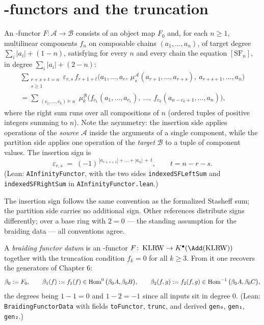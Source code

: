 \section{\texorpdfstring{\Ainf}{A-infinity}-functors and the truncation}

\begin{definition}\label{def:ainf-functor}
  An \Ainf-functor $F \colon \mathcal{A} \to \mathcal{B}$ consists of an
  object map $F_0$ and, for each $n \geq 1$, multilinear components $f_n$ on
  composable chains $(a_1, \dots, a_n)$, of target degree
  $\sum_i |a_i| + (1 - n)$, satisfying for every $n$ and every chain the
  equation $[\mathrm{SF}_n]$, in degree $\sum_i |a_i| + (2-n)$:
  \begin{multline*}
    \sum_{\substack{r + s + t = n\\ s \geq 1}}
      \varepsilon_{r,s}\,
      f_{r+1+t}\big(a_1, \dots, a_r,\ \mu^{\mathcal A}_s(a_{r+1}, \dots, a_{r+s}),\
        a_{r+s+1}, \dots, a_n\big) \\
    = \sum_{\substack{(c_1, \dots, c_k) \vDash n}}
      \mu^{\mathcal B}_k\big(f_{c_1}(a_1, \dots, a_{c_1}),\ \dots,\
        f_{c_k}(a_{n-c_k+1}, \dots, a_n)\big),
  \end{multline*}
  where the right sum runs over all compositions of $n$ (ordered tuples of
  positive integers summing to $n$). Note the asymmetry: the insertion side
  applies operations of the \emph{source} $\mathcal{A}$ inside the arguments
  of a single component, while the partition side applies one operation of
  the \emph{target} $\mathcal{B}$ to a tuple of component values. The
  insertion sign is
  \[
    \varepsilon_{r,s} \;=\; (-1)^{\,|a_{r+s+1}| + \dots + |a_n| \, +\, t},
    \qquad t = n - r - s .
  \]
  (Lean: \texttt{AInfinityFunctor}, with the two sides
  \texttt{indexedSFLeftSum} and \texttt{indexedSFRightSum} in
  \texttt{AInfinityFunctor.lean}.)
\end{definition}

\begin{remark}
  The insertion sign follows the same convention as the formalized Stasheff
  sum; the partition side carries no additional sign. Other references
  distribute signs differently; over a base ring with $2 = 0$ --- the standing
  assumption for the braiding data --- all conventions agree.
\end{remark}

\begin{definition}[braiding functor data]\label{def:bfd}
  A \emph{braiding functor datum} is an \Ainf-functor
  $F \colon \KLRW \to K^\bullet(\Add(\KLRW))$ together with the truncation
  condition $f_k = 0$ for all $k \geq 3$. From it one recovers the generators
  of Chapter 6:
  \[
    \beta_0 := F_0, \qquad
    \beta_1(f) := f_1(f) \in \operatorname{Hom}^{0}\big(\beta_0 A, \beta_0 B\big), \qquad
    \beta_2(f,g) := f_2(f,g) \in \operatorname{Hom}^{-1}\big(\beta_0 A, \beta_0 C\big),
  \]
  the degrees being $1 - 1 = 0$ and $1 - 2 = -1$ since all inputs sit in
  degree $0$. (Lean: \texttt{BraidingFunctorData} with fields
  \texttt{toFunctor}, \texttt{trunc}, and derived \texttt{gen₀},
  \texttt{gen₁}, \texttt{gen₂}.)
\end{definition}

